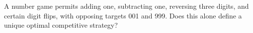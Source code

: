 A number game permits adding one, subtracting one, reversing three digits, and certain digit flips, with opposing targets 001 and 999. Does this alone define a unique optimal competitive strategy?
